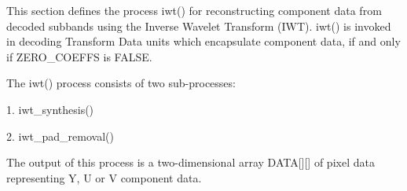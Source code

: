 
This section defines the process iwt() for reconstructing component data
from decoded subbands using the Inverse Wavelet Transform (IWT). iwt()
is invoked in decoding Transform Data units which encapsulate component
data, if and only if ZERO\_COEFFS is FALSE.

The iwt() process consists of two sub-processes:

1. iwt\_synthesis()

2. iwt\_pad\_removal()

The output of this process is a two-dimensional array DATA[][] of pixel
data representing Y, U or V component data.

